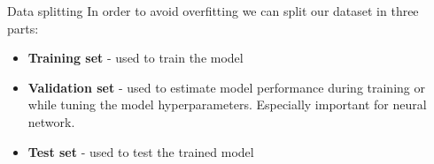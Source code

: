 \documentclass[9pt, aspectratio=169]{beamer}
\begin{document}
\begin{frame}
    {Data splitting}
    In order to avoid overfitting we can split our dataset in three parts:

    \begin{itemize}
        \item \textbf{Training set} - used to train the model
        \item \textbf{Validation set} - used to estimate model performance during training or while tuning the model hyperparameters. Especially important for neural network.
        \item \textbf{Test set} - used to test the trained model
    \end{itemize}

    \centering
\end{frame}
\end{document}
